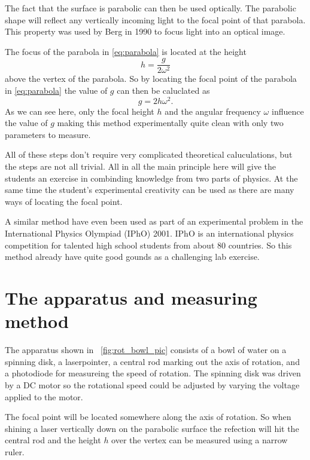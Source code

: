 \documentclass[11pt,towcolumn, swedish, english]{article}
\newcommand{\figref}{\figurename~\ref}
\begin{document}
The fact that the surface is parabolic can then be used optically. The parabolic
shape will reflect any vertically incoming light to the focal point of that
parabola. This property was used by Berg\cite{Berg1990} in 1990 to focus light
into an optical image. 

The focus of the parabola in \eqref{eq:parabola} is located at the
height\cite{Physics_Handbook} 
\begin{equation*}
h=\frac{g}{2\omega^2}
\end{equation*}
above the vertex of the parabola. So by locating the focal point of the parabola in \eqref{eq:parabola} the value of
$g$ can then be caluclated as
\begin{equation*}
g=2h\omega^2.
\end{equation*}
As we can see here, only the focal height $h$ and the angular
frequency $\omega$ influence the value of $g$ making this method
experimentally quite clean with only two parameters to measure. 

All of these steps don't require very complicated theoretical caluculations, but
the steps are not all trivial. All in all the main principle here will give the
students an exercise in combinding knowledge from two parts of physics. At the
same time the student's experimental creativity can be used as there are many
ways of locating the focal point. 

A similar method have even been used as part of an
experimental problem in the International Physics Olympiad (IPhO)
2001\cite{IPhO2001}. IPhO is an international physics competition for
talented high school students from about 80 countries. So this method
already have quite good gounds as a challenging lab exercise.


\section{The apparatus and measuring method}
The apparatus shown in \figref{fig:rot_bowl_pic} consists of a bowl of water
on a spinning disk, a laserpointer, a central rod marking out the axis of
rotation, and a photodiode for measureing the speed of rotation. The spinning
disk was driven by a DC motor so the rotational speed could be adjusted by varying
the voltage applied to the motor. 

The focal point will be located somewhere along the axis of rotation. So when
shining a laser vertically down on the parabolic surface the refection will hit
the central rod and the height $h$ over the vertex can be measured
using a narrow ruler. 
\end{document}
